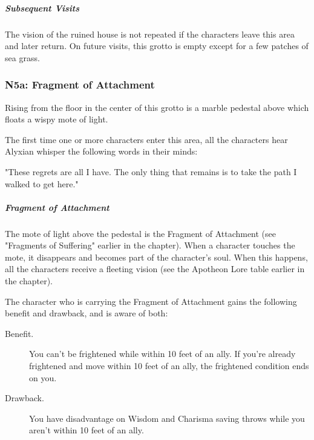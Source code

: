 \documentclass[10pt,a4paper,twoside,bg=print,twocolumn,openany,nodeprecatedcode]{dndbook}
\begin{document}
\subparagraph{Subsequent Visits}
The vision of the ruined house is not repeated if the characters leave this area and later return. On future visits, this grotto is empty except for a few patches of sea grass.

\subsubsection{N5a: Fragment of Attachment}
\begin{DndReadAloud}{}
Rising from the floor in the center of this grotto is a marble pedestal above which floats a wispy mote of light.

\end{DndReadAloud}

The first time one or more characters enter this area, all the characters hear Alyxian whisper the following words in their minds:

\begin{DndReadAloud}{}
"These regrets are all I have. The only thing that remains is to take the path I walked to get here."

\end{DndReadAloud}

\subparagraph{Fragment of Attachment}
The mote of light above the pedestal is the Fragment of Attachment (see "Fragments of Suffering" earlier in the chapter). When a character touches the mote, it disappears and becomes part of the character's soul. When this happens, all the characters receive a fleeting vision (see the Apotheon Lore table earlier in the chapter).

The character who is carrying the Fragment of Attachment gains the following benefit and drawback, and is aware of both:

\begin{DndSidebar}[float=!b]{}

\begin{description}
\item[Benefit.]
You can't be frightened while within 10 feet of an ally. If you're already frightened and move within 10 feet of an ally, the frightened condition ends on you.
\item[Drawback.]
You have disadvantage on Wisdom and Charisma saving throws while you aren't within 10 feet of an ally.
\end{description}



\end{DndSidebar}
\end{document}
